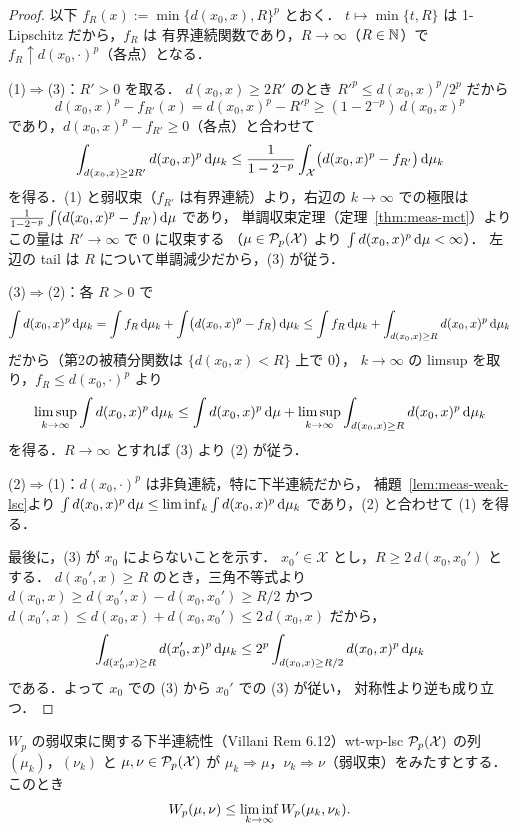 \begin{proof}
  以下 $f_R(x):=\min\{d(x_0,x),R\}^p$ とおく．
  $t\mapsto\min\{t,R\}$ は 1-Lipschitz だから，$f_R$ は
  有界連続関数であり，$R\to\infty$（$R\in\mathbb{N}$）で
  $f_R\uparrow d(x_0,\cdot)^p$（各点）となる．

  (1)$\Rightarrow$(3)：$R'>0$ を取る．
  $d(x_0,x)\geq2R'$ のとき
  $R'^p\leq d(x_0,x)^p/2^p$ だから
  \[
    d(x_0,x)^p-f_{R'}(x)
    =d(x_0,x)^p-R'^p
    \geq(1-2^{-p})\,d(x_0,x)^p
  \]
  であり，$d(x_0,x)^p-f_{R'}\geq0$（各点）と合わせて
  \[
    \int_{d(x_0,x)\geq2R'}d(x_0,x)^p\,\mathrm{d}\mu_k
    \leq\frac{1}{1-2^{-p}}
    \int_{\mathcal{X}}\bigl(d(x_0,x)^p-f_{R'}\bigr)\,\mathrm{d}\mu_k
  \]
  を得る．(1) と弱収束（$f_{R'}$ は有界連続）より，右辺の
  $k\to\infty$ での極限は
  $\frac{1}{1-2^{-p}}\int(d(x_0,x)^p-f_{R'})\,\mathrm{d}\mu$ であり，
  単調収束定理（定理~\ref{thm:meas-mct}）より
  この量は $R'\to\infty$ で $0$ に収束する
  （$\mu\in\mathcal{P}_{p}(\mathcal{X})$ より $\int d(x_0,x)^p\,\mathrm{d}\mu<\infty$）．
  左辺の tail は $R$ について単調減少だから，(3) が従う．

  (3)$\Rightarrow$(2)：各 $R>0$ で
  \[
    \int d(x_0,x)^p\,\mathrm{d}\mu_k
    =\int f_R\,\mathrm{d}\mu_k
    +\int\bigl(d(x_0,x)^p-f_R\bigr)\,\mathrm{d}\mu_k
    \leq\int f_R\,\mathrm{d}\mu_k
    +\int_{d(x_0,x)\geq R}d(x_0,x)^p\,\mathrm{d}\mu_k
  \]
  だから（第2の被積分関数は $\{d(x_0,x)<R\}$ 上で $0$），
  $k\to\infty$ の limsup を取り，$f_R\leq d(x_0,\cdot)^p$ より
  \[
    \limsup_{k\to\infty}\int d(x_0,x)^p\,\mathrm{d}\mu_k
    \leq\int d(x_0,x)^p\,\mathrm{d}\mu
    +\limsup_{k\to\infty}
    \int_{d(x_0,x)\geq R}d(x_0,x)^p\,\mathrm{d}\mu_k
  \]
  を得る．$R\to\infty$ とすれば (3) より (2) が従う．

  (2)$\Rightarrow$(1)：$d(x_0,\cdot)^p$ は非負連続，特に下半連続だから，
  補題~\ref{lem:meas-weak-lsc}より
  $\int d(x_0,x)^p\,\mathrm{d}\mu\leq\liminf_k\int d(x_0,x)^p\,\mathrm{d}\mu_k$
  であり，(2) と合わせて (1) を得る．

  最後に，(3) が $x_0$ によらないことを示す．
  $x_0'\in\mathcal{X}$ とし，$R\geq2\,d(x_0,x_0')$ とする．
  $d(x_0',x)\geq R$ のとき，三角不等式より
  $d(x_0,x)\geq d(x_0',x)-d(x_0,x_0')\geq R/2$ かつ
  $d(x_0',x)\leq d(x_0,x)+d(x_0,x_0')\leq2\,d(x_0,x)$ だから，
  \[
    \int_{d(x_0',x)\geq R}d(x_0',x)^p\,\mathrm{d}\mu_k
    \leq2^p\int_{d(x_0,x)\geq R/2}d(x_0,x)^p\,\mathrm{d}\mu_k
  \]
  である．よって $x_0$ での (3) から $x_0'$ での (3) が従い，
  対称性より逆も成り立つ．
\end{proof}

\begin{lemma}{$W_p$ の弱収束に関する下半連続性（Villani Rem 6.12）}{wt-wp-lsc}
  $\mathcal{P}_{p}(\mathcal{X})$ の列 $(\mu_k)$，$(\nu_k)$ と
  $\mu,\nu\in\mathcal{P}_{p}(\mathcal{X})$ が
  $\mu_k\Rightarrow\mu$，$\nu_k\Rightarrow\nu$（弱収束）をみたすとする．
  このとき
  \[
    W_p(\mu,\nu)\leq\liminf_{k\to\infty}W_p(\mu_k,\nu_k).
  \]
\end{lemma}

